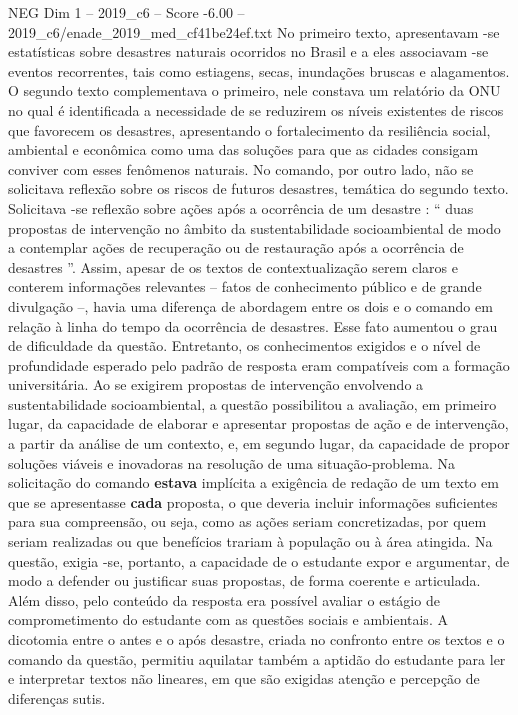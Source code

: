 \begin{textsample}{NEG Dim 1 – 2019\_c6 – Score -6.00 – 2019\_c6/enade\_2019\_med\_cf41be24ef.txt}
No primeiro texto, apresentavam -se estatísticas sobre desastres naturais ocorridos no Brasil e a eles associavam -se eventos recorrentes, tais como estiagens, secas, inundações bruscas e alagamentos.
O segundo texto complementava o primeiro, nele constava um relatório da ONU no qual é identificada a necessidade de se reduzirem os níveis existentes de riscos que favorecem os desastres, apresentando o fortalecimento da resiliência social, ambiental e econômica como uma das soluções para que as cidades consigam conviver com esses fenômenos naturais.
No comando, por outro lado, não se solicitava reflexão sobre os riscos de futuros desastres, temática do segundo texto.
Solicitava -se reflexão sobre ações após a ocorrência de um desastre : “ duas propostas de intervenção no âmbito da sustentabilidade socioambiental de modo a contemplar ações de recuperação ou de restauração após a ocorrência de desastres ”.
Assim, apesar de os textos de contextualização serem claros e conterem informações relevantes – fatos de conhecimento público e de grande divulgação –, havia uma diferença de abordagem entre os dois e o comando em relação à linha do tempo da ocorrência de desastres.
Esse fato aumentou o grau de dificuldade da questão.
Entretanto, os conhecimentos exigidos e o nível de profundidade esperado pelo padrão de resposta eram compatíveis com a formação universitária.
Ao se exigirem propostas de intervenção envolvendo a sustentabilidade socioambiental, a questão possibilitou a avaliação, em primeiro lugar, da capacidade de elaborar e apresentar propostas de ação e de intervenção, a partir da análise de um contexto, e, em segundo lugar, da capacidade de propor soluções viáveis e inovadoras na resolução de uma situação-problema.
Na solicitação do comando \textbf{estava} implícita a exigência de redação de um texto em que se apresentasse \textbf{cada} proposta, o que deveria incluir informações suficientes para sua compreensão, ou seja, como as ações seriam concretizadas, por quem seriam realizadas ou que benefícios trariam à população ou à área atingida.
Na questão, exigia -se, portanto, a capacidade de o estudante expor e argumentar, de modo a defender ou justificar suas propostas, de forma coerente e articulada.
Além disso, pelo conteúdo da resposta era possível avaliar o estágio de comprometimento do estudante com as questões sociais e ambientais.
A dicotomia entre o antes e o após desastre, criada no confronto entre os textos e o comando da questão, permitiu aquilatar também a aptidão do estudante para ler e interpretar textos não lineares, em que são exigidas atenção e percepção de diferenças sutis.

\end{textsample}
